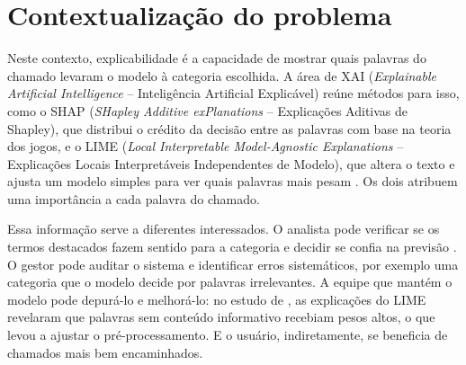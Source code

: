 \documentclass[
    12pt,                %
    openright,           %
    oneside,             %
    a4paper,             %
    english,             %
    brazil               %
]{abntex2}
\begin{document}
\section{Contextualização do problema}
\label{sec:contexto}

Neste contexto, explicabilidade é a capacidade de mostrar quais palavras do chamado levaram o modelo à categoria escolhida. A área de XAI (\textit{Explainable Artificial Intelligence} -- Inteligência Artificial Explicável) reúne métodos para isso, como o SHAP (\textit{SHapley Additive exPlanations} -- Explicações Aditivas de Shapley), que distribui o crédito da decisão entre as palavras com base na teoria dos jogos, e o LIME (\textit{Local Interpretable Model-Agnostic Explanations} -- Explicações Locais Interpretáveis Independentes de Modelo), que altera o texto e ajusta um modelo simples para ver quais palavras mais pesam \cite{lundberg2017, ribeiro2016}. Os dois atribuem uma importância a cada palavra do chamado.

Essa informação serve a diferentes interessados. O analista pode verificar se os termos destacados fazem sentido para a categoria e decidir se confia na previsão \cite{ribeiro2016}. O gestor pode auditar o sistema e identificar erros sistemáticos, por exemplo uma categoria que o modelo decide por palavras irrelevantes. A equipe que mantém o modelo pode depurá-lo e melhorá-lo: no estudo de , as explicações do LIME revelaram que palavras sem conteúdo informativo recebiam pesos altos, o que levou a ajustar o pré-processamento. E o usuário, indiretamente, se beneficia de chamados mais bem encaminhados.
\end{document}
